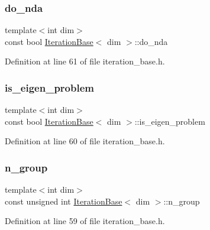 \subsubsection{\texorpdfstring{do\+\_\+nda}{do\_nda}}
{\footnotesize\ttfamily template$<$int dim$>$ \\
const bool \hyperlink{class_iteration_base}{Iteration\+Base}$<$ dim $>$\+::do\+\_\+nda\hspace{0.3cm}{\ttfamily [protected]}}



Definition at line 61 of file iteration\+\_\+base.\+h.

\mbox{\label{class_iteration_base_af630d420379811fe33e19c1c8691ad7c}} 
\subsubsection{\texorpdfstring{is\+\_\+eigen\+\_\+problem}{is\_eigen\_problem}}
{\footnotesize\ttfamily template$<$int dim$>$ \\
const bool \hyperlink{class_iteration_base}{Iteration\+Base}$<$ dim $>$\+::is\+\_\+eigen\+\_\+problem\hspace{0.3cm}{\ttfamily [protected]}}



Definition at line 60 of file iteration\+\_\+base.\+h.

\mbox{\label{class_iteration_base_a0c3ec88894828b2bbe3a5ab4fca927ae}} 
\subsubsection{\texorpdfstring{n\+\_\+group}{n\_group}}
{\footnotesize\ttfamily template$<$int dim$>$ \\
const unsigned int \hyperlink{class_iteration_base}{Iteration\+Base}$<$ dim $>$\+::n\+\_\+group\hspace{0.3cm}{\ttfamily [protected]}}



Definition at line 59 of file iteration\+\_\+base.\+h.


